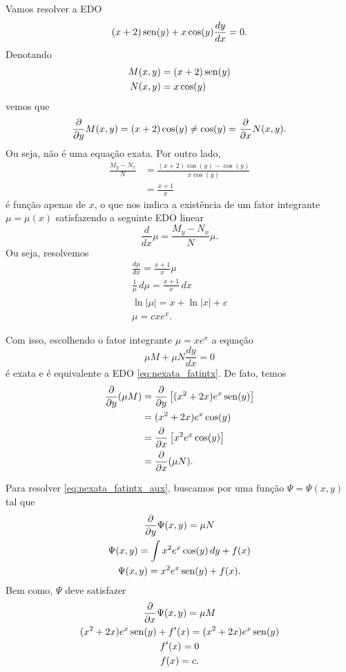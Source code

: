 \begin{ex}\label{ex:edo1ordem_exata_fix}
  Vamos resolver a EDO
  \begin{equation}\label{eq:nexata_fatintx}
    (x+2)\operatorname{sen}(y) + x\cos(y)\frac{dy}{dx} = 0.
  \end{equation}
  Denotando
  \begin{align}
    M(x,y) &= (x+2)\operatorname{sen}(y) \\
    N(x,y) &= x\cos(y)
  \end{align}
  vemos que
  \begin{equation}
    \frac{\partial}{\partial y}M(x,y) = (x+2)\cos(y) \neq \cos(y) = \frac{\partial}{\partial x}N(x,y).
  \end{equation}
  Ou seja, não é uma equação exata. Por outro lado,
  \begin{align}
    \frac{M_y-N_x}{N} &= \frac{(x+2)\cos(y) - \cos(y)}{x\cos(y)} \\
    &= \frac{x+1}{x}
  \end{align}
  é função apenas de $x$, o que nos indica a existência de um fator integrante $\mu = \mu(x)$ satisfazendo a seguinte EDO linear
  \begin{equation}
    \frac{d}{dx}\mu = \frac{M_y-N_x}{N}\mu. 
  \end{equation}
  Ou seja, resolvemos
  \begin{gather}
    \frac{d\mu}{dx} = \frac{x+1}{x}\mu \\
    \frac{1}{\mu}\,d\mu = \frac{x+1}{x}\,dx \\
    \ln|\mu| = x + \ln|x| + c \\
    \mu = cxe^x.
  \end{gather}

  Com isso, escolhendo o fator integrante $\mu = xe^x$ a equação
  \begin{equation}\label{eq:nexata_fatintx_aux}
    \mu M + \mu N\frac{dy}{dx} = 0
  \end{equation}
  é exata e é equivalente a EDO \eqref{eq:nexata_fatintx}. De fato, temos
  \begin{align}
    \frac{\partial}{\partial y}(\mu M) &= \frac{\partial}{\partial y}\left[(x^2+2x)e^x\operatorname{sen}(y)\right] \\
    &= (x^2+2x)e^x\cos(y) \\
    &= \frac{\partial}{\partial x} \left[x^2e^x\cos(y)\right] \\
    &= \frac{\partial}{\partial x}(\mu N).
  \end{align}

  Para resolver \eqref{eq:nexata_fatintx_aux}, buscamos por uma função $\Psi = \Psi(x,y)$ tal que
  \begin{gather}
    \frac{\partial}{\partial y}\Psi(x,y) = \mu N \\
    \Psi(x,y) = \int x^2e^x\cos(y)\,dy + f(x) \\
    \Psi(x,y) = x^2e^x\operatorname{sen}(y) + f(x).
  \end{gather}
  Bem como, $\Psi$ deve satisfazer
  \begin{gather}
    \frac{\partial}{\partial x}\Psi(x,y) = \mu M \\
    (x^2 + 2x)e^x\operatorname{sen}(y) + f'(x) = (x^2 + 2x)e^x\operatorname{sen}(y) \\
    f'(x) = 0 \\
    f(x) = c.
  \end{gather}


\end{ex}
